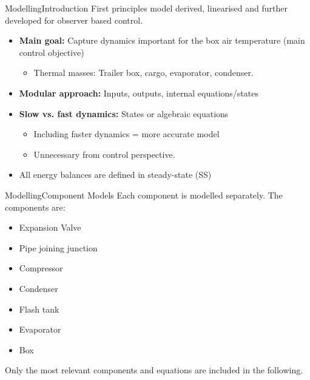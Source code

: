 \begin{frame}{Modelling}{Introduction}
	First principles model derived, linearised and further developed for observer based control.
	\begin{itemize}
		\item \textbf{Main goal:} Capture dynamics important for the box air temperature (main control objective)
		\begin{itemize}
			\item Thermal masses: Trailer box, cargo, evaporator, condenser.
		\end{itemize}
		\item \textbf{Modular approach:} Inputs, outputs, internal equations/states
		\item \textbf{Slow vs. fast dynamics:} States or algebraic equations
		\begin{itemize}
			\item Including faster dynamics = more accurate model
			\item Unnecessary from control perspective.
		\end{itemize}	
		\item All energy balances are defined in steady-state (SS)
	\end{itemize}
\end{frame}




\begin{frame}{Modelling}{Component Models}
	Each component is modelled separately. The components are:
	\begin{itemize}
		\item Expansion Valve
		\item Pipe joining junction
		\item Compressor
		\item Condenser
		\item Flash tank
		\item Evaporator
		\item Box
	\end{itemize}
	
	Only the most relevant components and equations are included in the following.
\end{frame}




